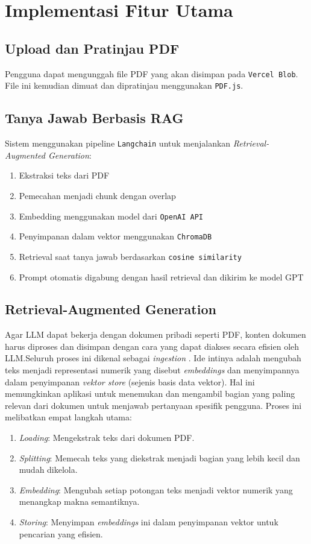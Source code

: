 \section{Implementasi Fitur Utama}
\subsection{Upload dan Pratinjau PDF}
Pengguna dapat mengunggah file PDF yang akan disimpan pada \texttt{Vercel Blob}. File ini kemudian dimuat dan dipratinjau menggunakan \texttt{PDF.js}.



\subsection{Tanya Jawab Berbasis RAG}
Sistem menggunakan pipeline \texttt{Langchain} untuk menjalankan \textit{Retrieval-Augmented Generation}:
\begin{enumerate}
  \item Ekstraksi teks dari PDF
  \item Pemecahan menjadi chunk dengan overlap
  \item Embedding menggunakan model dari \texttt{OpenAI API}
  \item Penyimpanan dalam vektor menggunakan \texttt{ChromaDB}
  \item Retrieval saat tanya jawab berdasarkan \texttt{cosine similarity}
  \item Prompt otomatis digabung dengan hasil retrieval dan dikirim ke model GPT
\end{enumerate}


\subsection{Retrieval-Augmented Generation}
Agar LLM dapat bekerja dengan dokumen pribadi seperti PDF, konten dokumen harus diproses dan disimpan dengan cara yang dapat diakses secara efisien oleh LLM.\@ Seluruh proses ini dikenal sebagai \emph{ingestion} \citep[p~.84]{oshin2024learning}. Ide intinya adalah mengubah teks menjadi representasi numerik yang disebut \emph{embeddings} dan menyimpannya dalam penyimpanan \emph{vektor store} (sejenis basis data vektor). Hal ini memungkinkan aplikasi untuk menemukan dan mengambil bagian yang paling relevan dari dokumen untuk menjawab pertanyaan spesifik pengguna. Proses ini melibatkan empat langkah utama:
\begin{enumerate}
  \item \emph{Loading}: Mengekstrak teks dari dokumen PDF.
  \item \emph{Splitting}: Memecah teks yang diekstrak menjadi bagian yang lebih kecil dan mudah dikelola.
  \item \emph{Embedding}: Mengubah setiap potongan teks menjadi vektor numerik yang menangkap makna semantiknya.
  \item \emph{Storing}: Menyimpan \emph{embeddings} ini dalam penyimpanan vektor untuk pencarian yang efisien.
\end{enumerate}

